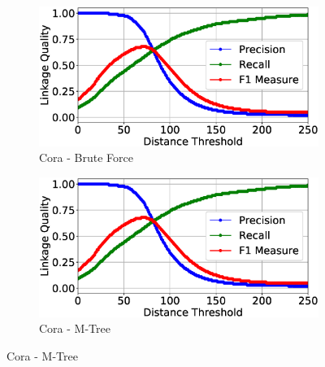 \documentclass{llncs}
\begin{document}
\begin{figure}
\centering
\begin{subfigure}{.5\textwidth}
  \centering
\includegraphics[width=\textwidth]{figures/plotLQ-cora-brute}
\caption{Cora - Brute Force}
\end{subfigure}%
\begin{subfigure}{.5\textwidth}
  \centering
\includegraphics[width=\textwidth]{figures/plotLQ-cora-mtree}
\caption{Cora - M-Tree}
\end{subfigure}


\end{figure}
\end{document}
